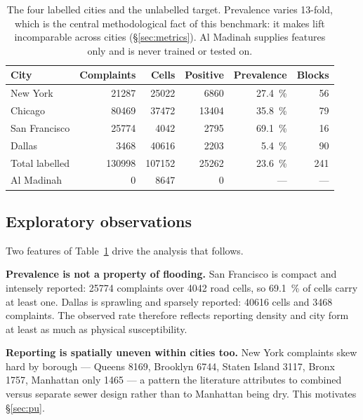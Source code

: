\documentclass[11pt]{article}
\begin{document}
\begin{table}[t]
\centering\small
\caption{The four labelled cities and the unlabelled target. Prevalence varies
\num{13}-fold, which is the central methodological fact of this benchmark: it
makes lift incomparable across cities (\S\ref{sec:metrics}). Al Madinah supplies
features only and is never trained or tested on.}
\label{tab:data}
\begin{tabular}{@{}lrrrrr@{}}
\toprule
City & Complaints & Cells & Positive & Prevalence & Blocks \\
\midrule
New York       & \num{21287} & \num{25022} & \num{6860}  & \SI{27.4}{\percent} & 56 \\
Chicago        & \num{80469} & \num{37472} & \num{13404} & \SI{35.8}{\percent} & 79 \\
San Francisco  & \num{25774} & \num{4042}  & \num{2795}  & \SI{69.1}{\percent} & 16 \\
Dallas         & \num{3468}  & \num{40616} & \num{2203}  & \SI{5.4}{\percent}  & 90 \\
\midrule
Total labelled & \num{130998} & \num{107152} & \num{25262} & \SI{23.6}{\percent} & 241 \\
\midrule
Al Madinah     & 0 & \num{8647} & 0 & --- & --- \\
\bottomrule
\end{tabular}
\end{table}

\subsection{Exploratory observations}
Two features of Table~\ref{tab:data} drive the analysis that follows.

\textbf{Prevalence is not a property of flooding.} San Francisco is compact and
intensely reported: \num{25774} complaints over \num{4042} road cells, so
\SI{69.1}{\percent} of cells carry at least one. Dallas is sprawling and sparsely
reported: \num{40616} cells and \num{3468} complaints. The observed rate
therefore reflects reporting density and city form at least as much as physical
susceptibility.

\textbf{Reporting is spatially uneven within cities too.} New York complaints
skew hard by borough --- Queens \num{8169}, Brooklyn \num{6744}, Staten Island
\num{3117}, Bronx \num{1757}, Manhattan only \num{1465} --- a pattern the
literature attributes to combined versus separate sewer design rather than to
Manhattan being dry. This motivates \S\ref{sec:pu}.
\end{document}
